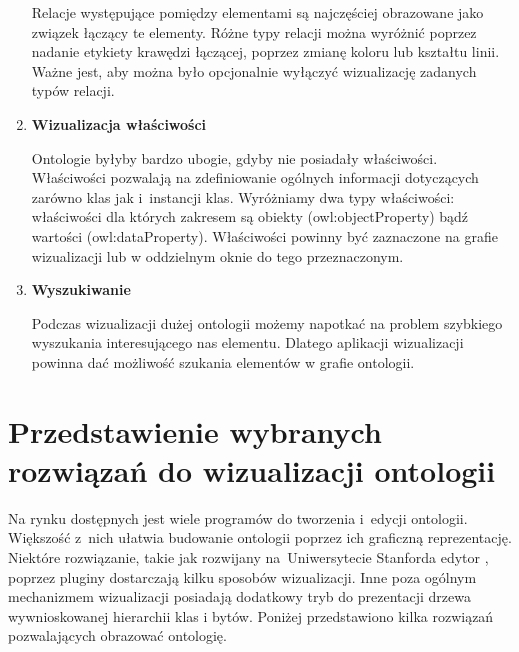 \begin{enumerate}
\nopagebreak

Relacje występujące pomiędzy elementami są najczęściej obrazowane jako związek łączący te elementy. Różne typy relacji można wyróżnić poprzez nadanie 
etykiety krawędzi łączącej, poprzez zmianę koloru lub kształtu linii. Ważne jest, aby można było opcjonalnie wyłączyć wizualizację zadanych typów
 relacji. 

\item{\bf Wizualizacja właściwości}

\nopagebreak

Ontologie byłyby bardzo ubogie, gdyby nie posiadały właściwości. Właściwości pozwalają na zdefiniowanie ogólnych informacji dotyczących zarówno
 klas jak i~instancji klas. Wyróżniamy dwa typy właściwości: właściwości dla których zakresem są obiekty (owl:objectProperty) bądź wartości 
(owl:dataProperty). Właściwości powinny być zaznaczone na grafie wizualizacji lub w oddzielnym oknie do tego przeznaczonym. 

\item{\bf Wyszukiwanie}

\nopagebreak

Podczas wizualizacji dużej ontologii możemy napotkać na problem szybkiego wyszukania interesującego nas elementu. Dlatego aplikacji wizualizacji powinna 
dać możliwość szukania elementów w grafie ontologii.    

\end{enumerate}


\section{Przedstawienie wybranych rozwiązań do wizualizacji ontologii}
Na rynku dostępnych jest wiele programów do tworzenia i~edycji ontologii. Większość z~nich ułatwia budowanie ontologii poprzez ich graficzną reprezentację.
 Niektóre rozwiązanie, takie jak rozwijany na~Uniwersytecie Stanforda edytor \protege , poprzez pluginy dostarczają kilku sposobów wizualizacji. Inne poza
ogólnym mechanizmem wizualizacji posiadają dodatkowy tryb do prezentacji drzewa wywnioskowanej hierarchii klas i bytów. Poniżej przedstawiono kilka rozwiązań 
pozwalających obrazować ontologię. 

